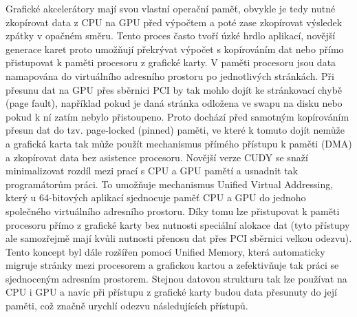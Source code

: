 Grafické akcelerátory mají svou vlastní operační paměť, obvykle je tedy nutné zkopírovat data z CPU na GPU před výpočtem a poté zase zkopírovat výsledek zpátky v opačném směru. Tento proces často tvoří úzké hrdlo aplikací, novější generace karet proto umožňují překrývat výpočet s kopírováním dat nebo přímo přistupovat k paměti procesoru z grafické karty. V paměti procesoru jsou data namapována do virtuálního adresního prostoru po jednotlivých stránkách. Při přesunu dat na GPU přes sběrnici PCI by tak mohlo dojít ke stránkovací chybě (page fault), například pokud je daná stránka odložena ve swapu na disku nebo pokud k ní zatím nebylo přistoupeno. Proto dochází před samotným kopírováním přesun dat do tzv. page-locked (pinned) paměti, ve které k tomuto dojít nemůže a grafická karta tak může použít mechanismus přímého přístupu k paměti (DMA) a zkopírovat data bez asistence procesoru. Novější verze CUDY se snaží minimalizovat rozdíl mezi prací s CPU a GPU pamětí a usnadnit tak programátorům práci. To umožňuje mechanismus Unified Virtual Addressing, který u 64-bitových aplikací sjednocuje paměť CPU a GPU do jednoho společného virtuálního adresního prostoru. Díky tomu lze přistupovat k paměti procesoru přímo z grafické karty bez nutnosti speciální alokace dat (tyto přístupy ale samozřejmě mají kvůli nutnosti přenosu dat přes PCI sběrnici velkou odezvu). Tento koncept byl dále rozšířen pomocí Unified Memory, která automaticky migruje stránky mezi procesorem a grafickou kartou a zefektivňuje tak práci se sjednoceným adresním prostorem. Stejnou datovou strukturu tak lze používat na CPU i GPU a navíc při přístupu z grafické karty budou data přesunuty do její paměti, což značně urychlí odezvu následujících přístupů.

